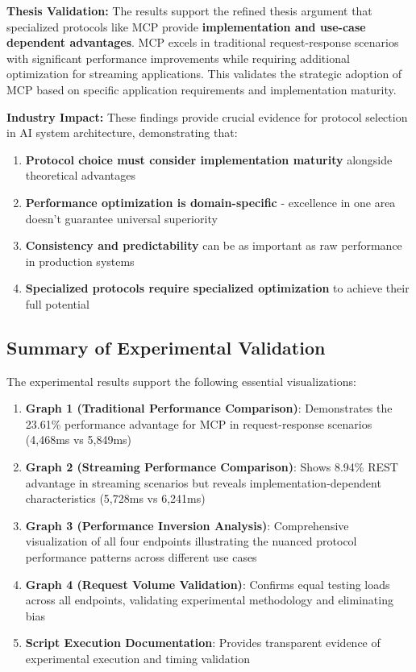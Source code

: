 \textbf{Thesis Validation:}
The results support the refined thesis argument that specialized protocols like MCP provide \textbf{implementation and use-case dependent advantages}. MCP excels in traditional request-response scenarios with significant performance improvements while requiring additional optimization for streaming applications. This validates the strategic adoption of MCP based on specific application requirements and implementation maturity.

\textbf{Industry Impact:}
These findings provide crucial evidence for protocol selection in AI system architecture, demonstrating that:

\begin{enumerate}
    \item \textbf{Protocol choice must consider implementation maturity} alongside theoretical advantages
    \item \textbf{Performance optimization is domain-specific} - excellence in one area doesn't guarantee universal superiority
    \item \textbf{Consistency and predictability} can be as important as raw performance in production systems
    \item \textbf{Specialized protocols require specialized optimization} to achieve their full potential
\end{enumerate}

\subsection{Summary of Experimental Validation}

The experimental results support the following essential visualizations:

\begin{enumerate}
    \item \textbf{Graph 1 (Traditional Performance Comparison)}: Demonstrates the 23.61\% performance advantage for MCP in request-response scenarios (4,468ms vs 5,849ms)
    \item \textbf{Graph 2 (Streaming Performance Comparison)}: Shows 8.94\% REST advantage in streaming scenarios but reveals implementation-dependent characteristics (5,728ms vs 6,241ms)
    \item \textbf{Graph 3 (Performance Inversion Analysis)}: Comprehensive visualization of all four endpoints illustrating the nuanced protocol performance patterns across different use cases
    \item \textbf{Graph 4 (Request Volume Validation)}: Confirms equal testing loads across all endpoints, validating experimental methodology and eliminating bias
    \item \textbf{Script Execution Documentation}: Provides transparent evidence of experimental execution and timing validation
\end{enumerate}

